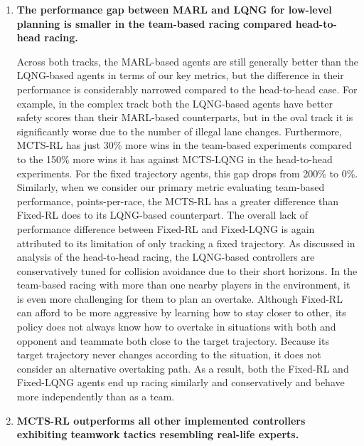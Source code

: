 \begin{enumerate}[wide, labelindent=0pt, font=\bfseries]
\item \textbf{The performance gap between MARL and LQNG for low-level planning is smaller in the team-based racing compared head-to-head racing.}  

Across both tracks, the MARL-based agents are still generally better than the LQNG-based agents in terms of our key metrics, but the difference in their performance is considerably narrowed  compared to the head-to-head case. For example, in the complex track both the LQNG-based agents have better safety scores than their MARL-based counterparts, but in the oval track it is significantly worse due to the number of illegal lane changes. Furthermore, MCTS-RL has just 30\% more wins in the team-based experiments compared to the 150\% more wins it has against MCTS-LQNG in the head-to-head experiments. For the fixed trajectory agents, this gap drops from 200\% to 0\%. Similarly, when we consider our primary metric evaluating team-based performance, points-per-race, the MCTS-RL has a greater difference than Fixed-RL does to its LQNG-based counterpart. The overall lack of performance difference between Fixed-RL and Fixed-LQNG is again attributed to its limitation of only tracking a fixed trajectory.  As discussed in analysis of the head-to-head racing, the LQNG-based controllers are conservatively tuned for collision avoidance due to their short horizons. In the team-based racing with more than one nearby players in the environment, it is even more challenging for them to plan an overtake. Although Fixed-RL can afford to be more aggressive by learning how to stay closer to other, its policy does not always know how to overtake in situations with both and opponent and teammate both close to the target trajectory. Because its target trajectory never changes according to the situation, it does not consider an alternative overtaking path. As a result, both the Fixed-RL and Fixed-LQNG agents end up racing similarly and conservatively and behave more independently than as a team.

\item \textbf{MCTS-RL outperforms all other implemented controllers exhibiting teamwork tactics resembling real-life experts.}  


\end{enumerate}
